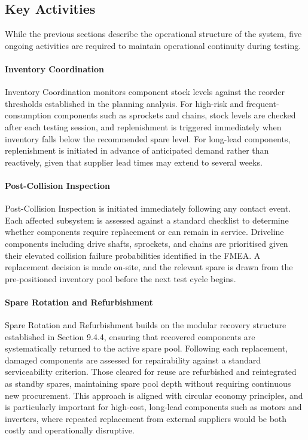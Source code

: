 \documentclass[11pt, a4paper]{report}
\numberwithin{equation}{section}
\begin{document}
\begin{refsection}
\subsection{Key Activities}

While the previous sections describe the operational structure of the system, five ongoing activities are required to maintain operational continuity during testing.

\paragraph{Inventory Coordination}
Inventory Coordination monitors component stock levels against the reorder thresholds established in the planning analysis. For high-risk and frequent-consumption components such as sprockets and chains, stock levels are checked after each testing session, and replenishment is triggered immediately when inventory falls below the recommended spare level. For long-lead components, replenishment is initiated in advance of anticipated demand rather than reactively, given that supplier lead times may extend to several weeks.

\paragraph{Post-Collision Inspection}
Post-Collision Inspection is initiated immediately following any contact event. Each affected subsystem is assessed against a standard checklist to determine whether components require replacement or can remain in service. Driveline components including drive shafts, sprockets, and chains are prioritised given their elevated collision failure probabilities identified in the FMEA. A replacement decision is made on-site, and the relevant spare is drawn from the pre-positioned inventory pool before the next test cycle begins.

\paragraph{Spare Rotation and Refurbishment}
Spare Rotation and Refurbishment builds on the modular recovery structure established in Section 9.4.4, ensuring that recovered components are systematically returned to the active spare pool. Following each replacement, damaged components are assessed for repairability against a standard serviceability criterion. Those cleared for reuse are refurbished and reintegrated as standby spares, maintaining spare pool depth without requiring continuous new procurement. This approach is aligned with circular economy principles, and is particularly important for high-cost, long-lead components such as motors and inverters, where repeated replacement from external suppliers would be both costly and operationally disruptive.


\end{refsection}
\end{document}
